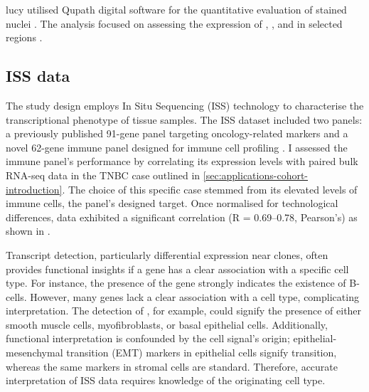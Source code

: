 \ac{lucy} utilised Qupath digital software for the quantitative evaluation of stained nuclei \parencite{Bankhead2017-px}. The analysis focused on assessing the expression of , , and  in selected regions .

\subsection{\Acl{ISS} data}
\label{sec:modalities-iss}


The study design employs In Situ Sequencing (\ac{ISS}) technology to characterise the transcriptional phenotype of tissue samples. The \ac{ISS} dataset included two panels: a previously published 91-gene panel targeting oncology-related markers and a novel 62-gene immune panel designed for immune cell profiling . I assessed the immune panel's performance by correlating its expression levels with paired bulk RNA-seq data in the \acf{TNBC} case outlined in \cref{sec:applications-cohort-introduction}. The choice of this specific case stemmed from its elevated levels of immune cells, the panel's designed target. Once normalised for technological differences, data exhibited a significant correlation (R = 0.69–0.78, Pearson's) as shown in .

Transcript detection, particularly differential expression near clones, often provides functional insights if a gene has a clear association with a specific cell type. For instance, the presence of the  gene strongly indicates the existence of B-cells. However, many genes lack a clear association with a cell type, complicating interpretation. The detection of , for example, could signify the presence of either smooth muscle cells, myofibroblasts, or basal epithelial cells. Additionally, functional interpretation is confounded by the cell signal's origin; epithelial-mesenchymal transition (EMT) markers in epithelial cells signify transition, whereas the same markers in stromal cells are standard. Therefore, accurate interpretation of \ac{ISS} data requires knowledge of the originating cell type.


